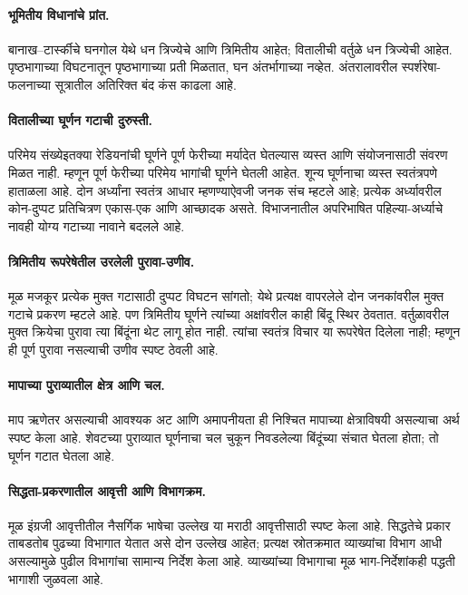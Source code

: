 \paragraph{भूमितीय विधानांचे प्रांत.} बानाख--टार्स्कीचे घनगोल येथे धन त्रिज्येचे आणि त्रिमितीय आहेत; वितालीची वर्तुळे धन त्रिज्येची आहेत. पृष्ठभागाच्या विघटनातून पृष्ठभागाच्या प्रती मिळतात, घन अंतर्भागाच्या नव्हेत. अंतरालावरील स्पर्शरेषा-फलनाच्या सूत्रातील अतिरिक्त बंद कंस काढला आहे.
\paragraph{वितालीच्या घूर्णन गटाची दुरुस्ती.} परिमेय संख्येइतक्या रेडियनांची घूर्णने पूर्ण फेरीच्या मर्यादेत घेतल्यास व्यस्त आणि संयोजनासाठी संवरण मिळत नाही. म्हणून पूर्ण फेरीच्या परिमेय भागांची घूर्णने घेतली आहेत. शून्य घूर्णनाचा व्यस्त स्वतंत्रपणे हाताळला आहे. दोन अर्ध्यांना स्वतंत्र आधार म्हणण्याऐवजी जनक संच म्हटले आहे; प्रत्येक अर्ध्यावरील कोन-दुप्पट प्रतिचित्रण एकास-एक आणि आच्छादक असते. विभाजनातील अपरिभाषित पहिल्या-अर्ध्याचे नावही योग्य गटाच्या नावाने बदलले आहे.
\paragraph{त्रिमितीय रूपरेषेतील उरलेली पुरावा-उणीव.} मूळ मजकूर प्रत्येक मुक्त गटासाठी दुप्पट विघटन सांगतो; येथे प्रत्यक्ष वापरलेले दोन जनकांवरील मुक्त गटाचे प्रकरण म्हटले आहे. पण त्रिमितीय घूर्णने त्यांच्या अक्षांवरील काही बिंदू स्थिर ठेवतात. वर्तुळावरील मुक्त क्रियेचा पुरावा त्या बिंदूंना थेट लागू होत नाही. त्यांचा स्वतंत्र विचार या रूपरेषेत दिलेला नाही; म्हणून ही पूर्ण पुरावा नसल्याची उणीव स्पष्ट ठेवली आहे.
\paragraph{मापाच्या पुराव्यातील क्षेत्र आणि चल.} माप ऋणेतर असल्याची आवश्यक अट आणि अमापनीयता ही निश्चित मापाच्या क्षेत्राविषयी असल्याचा अर्थ स्पष्ट केला आहे. शेवटच्या पुराव्यात घूर्णनाचा चल चुकून निवडलेल्या बिंदूंच्या संचात घेतला होता; तो घूर्णन गटात घेतला आहे.


\paragraph{सिद्धता-प्रकरणातील आवृत्ती आणि विभागक्रम.} मूळ इंग्रजी आवृत्तीतील नैसर्गिक भाषेचा उल्लेख या मराठी आवृत्तीसाठी स्पष्ट केला आहे. सिद्धतेचे प्रकार ताबडतोब पुढच्या विभागात येतात असे दोन उल्लेख आहेत; प्रत्यक्ष स्रोतक्रमात व्याख्यांचा विभाग आधी असल्यामुळे पुढील विभागांचा सामान्य निर्देश केला आहे. व्याख्यांच्या विभागाचा मूळ भाग-निर्देशांकही पद्धती भागाशी जुळवला आहे.
